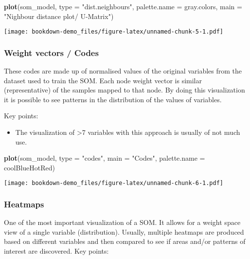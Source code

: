 \documentclass[]{book}
\newenvironment{Shaded}{\begin{snugshade}}{\end{snugshade}}
\newcommand{\KeywordTok}[1]{\textcolor[rgb]{0.13,0.29,0.53}{\textbf{{#1}}}}
\newcommand{\DataTypeTok}[1]{\textcolor[rgb]{0.13,0.29,0.53}{{#1}}}
\newcommand{\StringTok}[1]{\textcolor[rgb]{0.31,0.60,0.02}{{#1}}}
\newcommand{\NormalTok}[1]{{#1}}
\providecommand{\tightlist}{%
  \setlength{\itemsep}{0pt}\setlength{\parskip}{0pt}}
\begin{document}
\begin{Shaded}
\begin{Highlighting}[]
\KeywordTok{plot}\NormalTok{(som_model,}
     \DataTypeTok{type =} \StringTok{"dist.neighbours"}\NormalTok{,}
     \DataTypeTok{palette.name =} \NormalTok{gray.colors,}
     \DataTypeTok{main =} \StringTok{"Nighbour distance plot/ U-Matrix"}\NormalTok{)}
\end{Highlighting}
\end{Shaded}

\texttt{[image: bookdown-demo\_files/figure-latex/unnamed-chunk-5-1.pdf]}

\subsubsection{Weight vectors / Codes}\label{weight-vectors-codes}

These codes are made up of normalised values of the original variables
from the dataset used to train the SOM. Each node weight vector is
similar (representative) of the samples mapped to that node. By doing
this visualization it is possible to see patterns in the distribution of
the values of variables.

Key points:

\begin{itemize}
\tightlist
\item
  The visualization of \textgreater{}7 variables with this approach is
  usually of not much use.
\end{itemize}

\begin{Shaded}
\begin{Highlighting}[]
\KeywordTok{plot}\NormalTok{(som_model,}
     \DataTypeTok{type =} \StringTok{"codes"}\NormalTok{,}
     \DataTypeTok{main =} \StringTok{"Codes"}\NormalTok{,}
     \DataTypeTok{palette.name =} \NormalTok{coolBlueHotRed)}
\end{Highlighting}
\end{Shaded}

\texttt{[image: bookdown-demo\_files/figure-latex/unnamed-chunk-6-1.pdf]}

\subsubsection{Heatmaps}\label{heatmaps}

One of the most important visualization of a SOM. It allows for a weight
space view of a single variable (distribution). Usually, multiple
heatmaps are produced based on different variables and then compared to
see if areas and/or patterns of interest are discovered. Key points:
\end{document}
